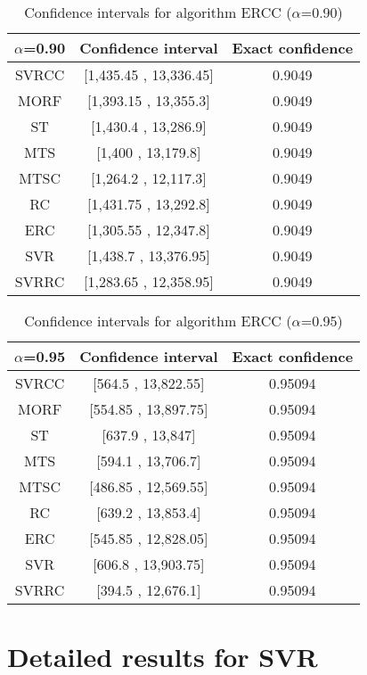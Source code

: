 \documentclass[a4paper,10pt]{article}
\begin{document}
\begin{table}[!htp]
\centering\small
\begin{tabular}{
|c|c|c|}
\hline
 $\alpha$=0.90 & Confidence interval & Exact confidence \\ \hline 
SVRCC & [1,435.45 , 13,336.45] & 0.9049\\ \hline 
MORF & [1,393.15 , 13,355.3] & 0.9049\\ \hline 
ST & [1,430.4 , 13,286.9] & 0.9049\\ \hline 
MTS & [1,400 , 13,179.8] & 0.9049\\ \hline 
MTSC & [1,264.2 , 12,117.3] & 0.9049\\ \hline 
RC & [1,431.75 , 13,292.8] & 0.9049\\ \hline 
ERC & [1,305.55 , 12,347.8] & 0.9049\\ \hline 
SVR & [1,438.7 , 13,376.95] & 0.9049\\ \hline 
SVRRC & [1,283.65 , 12,358.95] & 0.9049\\ \hline 

\end{tabular}
\caption{Confidence intervals for algorithm ERCC ($\alpha$=0.90)}
\end{table}
\begin{table}[!htp]
\centering\small
\begin{tabular}{
|c|c|c|}
\hline
 $\alpha$=0.95 & Confidence interval & Exact confidence \\ \hline 
SVRCC & [564.5 , 13,822.55] & 0.95094\\ \hline 
MORF & [554.85 , 13,897.75] & 0.95094\\ \hline 
ST & [637.9 , 13,847] & 0.95094\\ \hline 
MTS & [594.1 , 13,706.7] & 0.95094\\ \hline 
MTSC & [486.85 , 12,569.55] & 0.95094\\ \hline 
RC & [639.2 , 13,853.4] & 0.95094\\ \hline 
ERC & [545.85 , 12,828.05] & 0.95094\\ \hline 
SVR & [606.8 , 13,903.75] & 0.95094\\ \hline 
SVRRC & [394.5 , 12,676.1] & 0.95094\\ \hline 

\end{tabular}
\caption{Confidence intervals for algorithm ERCC ($\alpha$=0.95)}
\end{table}

 \clearpage 


\section{Detailed results for SVR}
\end{document}
